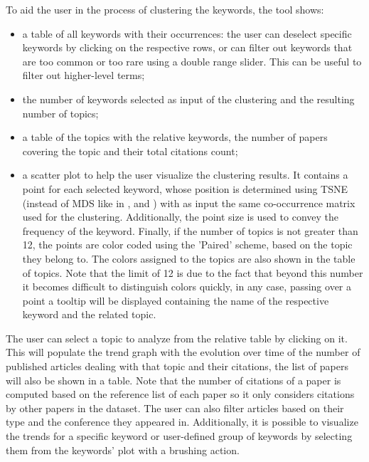 \documentclass[11pt]{article}
\begin{document}
To aid the user in the process of clustering the keywords, the tool shows:
\begin{itemize}
\item a table of all keywords with their occurrences: the user can deselect specific keywords by clicking on the respective rows, or can filter out keywords that are too common or too rare using a double range slider. This can be useful to filter out higher-level terms;
\item the number of keywords selected as input of the clustering and the resulting number of topics;
\item a table of the topics with the relative keywords, the number of papers covering the topic and their total citations count;
\item a scatter plot to help the user visualize the clustering results. It contains a point for each selected keyword, whose position is determined using TSNE (instead of MDS like in \cite{Hu2013ACA}, \cite{7539364} and \cite{9373186}) with as input the same co-occurrence matrix used for the clustering. Additionally, the point size is used to convey the frequency of the keyword. Finally, if the number of topics is not greater than 12, the points are color coded using the 'Paired' scheme, based on the topic they belong to. The colors assigned to the topics are also shown in the table of topics. Note that the limit of 12 is due to the fact that beyond this number it becomes difficult to distinguish colors quickly, in any case, passing over a point a tooltip will be displayed containing the name of the respective keyword and the related topic.
\end{itemize}

The user can select a topic to analyze from the relative table by clicking on it. This will populate the trend graph with the evolution over time of the number of published articles dealing with that topic and their citations, the list of papers will also be shown in a table. Note that the number of citations of a paper is computed based on the reference list of each paper so it only considers citations by other papers in the dataset. The user can also filter articles based on their type and the conference they appeared in. Additionally, it is possible to visualize the trends for a specific keyword or user-defined group of keywords by selecting them from the keywords' plot with a brushing action. 
\end{document}
